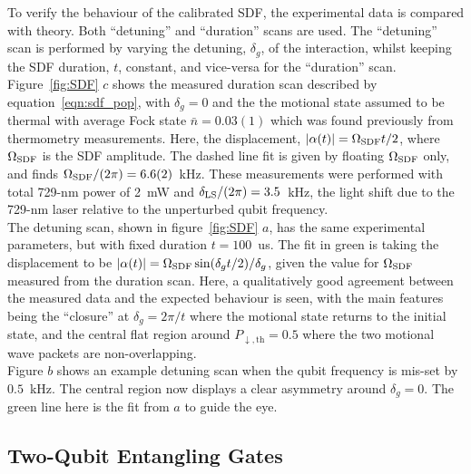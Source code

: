     To verify the behaviour of the calibrated SDF, the experimental data is compared with theory. Both
    ``detuning'' and ``duration'' scans are used. The ``detuning'' scan is performed by
    varying the detuning, $\delta_g$, of the interaction, whilst keeping the
    SDF duration, $t$, constant, and vice-versa for the ``duration'' scan. \\
    Figure~\ref{fig:SDF} $c$ shows the measured duration scan described by equation~\ref{eqn:sdf_pop}, with $\delta_g = 0$ and the the motional state assumed to be thermal with average Fock state $\bar{n}
    = 0.03(1)$ which was found previously from thermometry measurements.
    Here, the displacement, $|\alpha(t)| = \Omega_{\rm SDF} t/2$, where $\Omega_{\rm SDF}$ is the
    SDF amplitude. The dashed line fit is given by floating $\Omega_{\rm SDF}$ only, and finds $\Omega_{\rm SDF}/(2\pi) = 6.6(2)$~\unit{kHz}.
    These measurements were performed with total 729-nm power of 2~mW and $\delta_{\rm LS}/(2\pi) = 3.5$~\unit{\kHz}, the light shift due to the 729-nm laser relative to the unperturbed qubit frequency. \\
    The detuning scan, shown in figure~\ref{fig:SDF} $a$, has the same experimental parameters, but with fixed duration $t=100$~\unit{us}. The fit in green is taking the 
    displacement to be $|\alpha(t)| = \Omega_{\rm SDF} \sin(\delta_g t/2)/\delta_g$, given the value for $\Omega_{\rm SDF}$ measured from the duration scan. Here,
    a qualitatively good agreement between the measured data and the
    expected behaviour is seen, with the main features being the ``closure''
    at $\delta_g = 2\pi/t$ where the motional state returns to the initial state,
    and the central flat region around $P_{\downarrow, \mathrm{th}} =0.5$ where
    the two motional wave packets are non-overlapping.\\
    Figure $b$ shows an example detuning scan when the qubit frequency is mis-set by $0.5$~\unit{\kHz}. The central region now displays a clear asymmetry around $\delta_g = 0$. The green line here is the fit from $a$ to guide the eye.


\subsection{Two-Qubit Entangling Gates}
\label{sec:Two-Qubit Entangling Gates}

